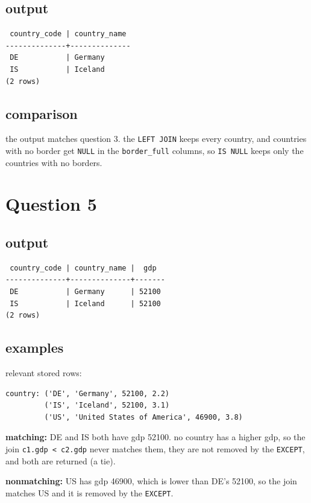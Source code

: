 \documentclass[11pt]{article}
\begin{document}
\subsection*{output}
{\small
\begin{verbatim}
 country_code | country_name
--------------+--------------
 DE           | Germany
 IS           | Iceland
(2 rows)
\end{verbatim}
}

\subsection*{comparison}
the output matches question 3. the \texttt{LEFT JOIN} keeps every country, and countries with no
border get \texttt{NULL} in the \texttt{border\_full} columns, so \texttt{IS NULL} keeps only the
countries with no borders.

\section*{Question 5}

\subsection*{output}
{\small
\begin{verbatim}
 country_code | country_name |  gdp
--------------+--------------+-------
 DE           | Germany      | 52100
 IS           | Iceland      | 52100
(2 rows)
\end{verbatim}
}

\subsection*{examples}
relevant stored rows:
{\small
\begin{verbatim}
country: ('DE', 'Germany', 52100, 2.2)
         ('IS', 'Iceland', 52100, 3.1)
         ('US', 'United States of America', 46900, 3.8)
\end{verbatim}
}

\noindent\textbf{matching:} DE and IS both have gdp 52100. no country has a higher gdp,
so the join \texttt{c1.gdp < c2.gdp} never matches them, they are not removed by the
\texttt{EXCEPT}, and both are returned (a tie).

\noindent\textbf{nonmatching:} US has gdp 46900, which is lower than DE's 52100, so the join matches US
and it is removed by the \texttt{EXCEPT}.
\end{document}

